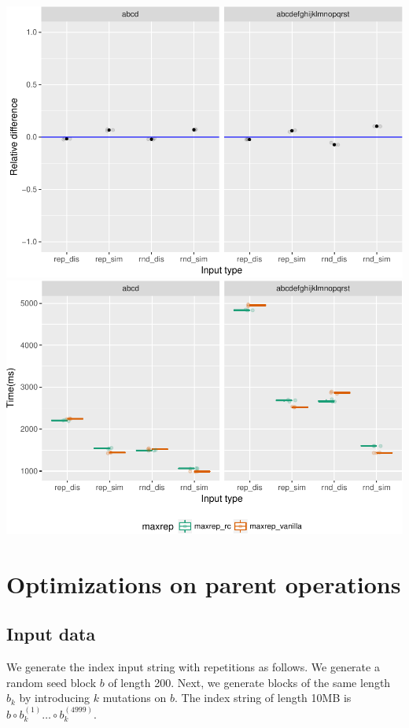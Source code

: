 \documentclass[]{article}
\begin{document}
\includegraphics{sea_2018_files/figure-latex/maxrep3_plot-1.pdf}
\includegraphics{sea_2018_files/figure-latex/maxrep3_plot-2.pdf}

\section{Optimizations on parent
operations}\label{optimizations-on-parent-operations}

\subsection{Input data}\label{input-data-1}

We generate the index input string with repetitions as follows. We
generate a random seed block \(b\) of length 200. Next, we generate
blocks of the same length \(b_k\) by introducing \(k\) mutations on
\(b\). The index string of length 10MB is
\(b\circ b_k^{(1)} \ldots \circ b_k^{(4999)}\).
\end{document}
